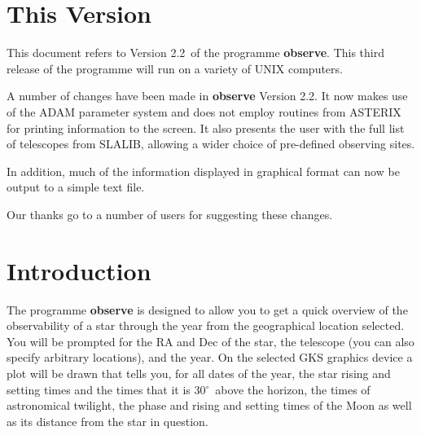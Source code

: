 \documentclass[11pt]{article}
\newcommand{\stardocinitials}  {SUN}
\newcommand{\stardocnumber}    {146.4}
\newcommand{\stardocversion}   {Version 2.2}
\newcommand{\stardocabstract}  {[Text of abstract]}
\newcommand{\stardocname}{\stardocinitials /\stardocnumber}
\newenvironment{latexonly}{}{}
\newcommand{\xlabel}[1]{}
\newcommand{\latexonlytoc}[0]{\tableofcontents}
\newcommand{\degrees}{\hbox{$^\circ$}}
\newcommand{\degrees}{{\rawhtml &deg;}}
\begin{document}
 \begin{latexonly}
   \setlength{\parskip}{0mm}
   \latexonlytoc
   \setlength{\parskip}{\medskipamount}
   \markright{\stardocname}
 \end{latexonly}
\newpage

\section{\xlabel{VERSION}This Version}
\label{sec:version}

This document refers to \stardocversion\ of the programme {\bf{observe}}.
This third release of the programme will run on a variety of UNIX
computers.

A number of changes have been made in {\bf{observe}} \stardocversion.
It now makes use of the ADAM parameter system and does not employ
routines from {\sc ASTERIX} for printing information to the screen. It
also presents the user with the full list of telescopes from SLALIB,
allowing a wider choice of pre-defined observing sites.

In addition, much of the information displayed in graphical format
can now be output to a simple text file.

Our thanks go to a number of users for suggesting these changes.

\section{\xlabel{INTRODUCTION}Introduction}
\label{sec:introduction}

The programme {\bf{observe}} is designed to allow you to get a quick
overview of the observability of a star through the year from the
geographical location selected. You will be prompted for the RA and Dec
of the star, the telescope (you can also specify arbitrary locations),
and the year. On the selected GKS graphics device a plot will be drawn
that tells you, for all dates of the year, the star rising and setting
times and the times that it is 30\degrees\ above the  horizon, the
times of astronomical twilight, the phase and rising and setting  times
of the Moon as well as its distance from the star in question.
\end{document}
